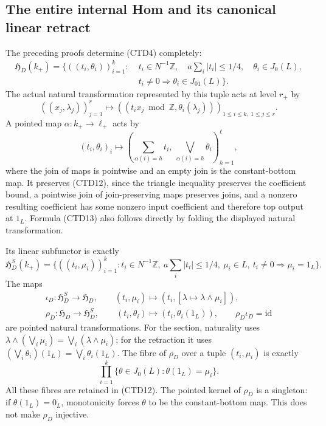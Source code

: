 \subsection{The entire internal Hom and its canonical linear retract}

The preceding proofs determine (CTD4) completely:
\begin{equation}\tag{CTD12}
\begin{split}
\mathfrak H_D(k_+)=\{((t_i,\theta_i))_{i=1}^k:\;&
 t_i\in N^{-1}\mathbb Z,\quad
 a\sum_i|t_i|\le1/4,\quad \theta_i\in J_0(L),\\
 &t_i\ne0\Longrightarrow\theta_i\in J_{01}(L)\}.
\end{split}
\end{equation}
The actual natural transformation represented by this tuple acts
at level $r_+$ by
\[
((x_j,\lambda_j))_{j=1}^r
\longmapsto
((t_i x_j\bmod\mathbb Z,\theta_i(\lambda_j)))_
 {1\le i\le k,\ 1\le j\le r}.
\]
A pointed map $\alpha:k_+\to\ell_+$ acts by
\begin{equation}\tag{CTD13}
(t_i,\theta_i)_i\longmapsto
\left(\sum_{\alpha(i)=h}t_i,\
      \bigvee_{\alpha(i)=h}\theta_i\right)_{h=1}^{\ell},
\end{equation}
where the join of maps is pointwise and an empty join is the
constant-bottom map. It preserves (CTD12), since the triangle
inequality preserves the coefficient bound, a pointwise join of
join-preserving maps preserves joins, and a nonzero resulting
coefficient has some nonzero input coefficient and therefore
top output at $1_L$. Formula (CTD13) also follows directly by
folding the displayed natural transformation.

Its linear subfunctor is exactly
\begin{equation}\tag{CTD14}
\mathfrak H_D^S(k_+)=
\{((t_i,\mu_i))_{i=1}^k:
t_i\in N^{-1}\mathbb Z,\ a\sum_i|t_i|\le1/4,\
\mu_i\in L,\ t_i\ne0\Rightarrow\mu_i=1_L\}.
\end{equation}
The maps
\begin{equation}\tag{CTD15}
\begin{gathered}
\iota_D:\mathfrak H_D^S\longrightarrow\mathfrak H_D,\qquad
(t_i,\mu_i)\longmapsto(t_i,[\lambda\mapsto\lambda\wedge\mu_i]),\\
\rho_D:\mathfrak H_D\longrightarrow\mathfrak H_D^S,\qquad
(t_i,\theta_i)\longmapsto(t_i,\theta_i(1_L)),\qquad
\rho_D\iota_D=\mathrm{id}
\end{gathered}
\end{equation}
are pointed natural transformations. For the section, naturality
uses $\lambda\wedge(\bigvee_i\mu_i)
=\bigvee_i(\lambda\wedge\mu_i)$; for the retraction it uses
$(\bigvee_i\theta_i)(1_L)=\bigvee_i\theta_i(1_L)$.
The fibre of $\rho_D$ over a tuple $(t_i,\mu_i)$ is exactly
\[
\prod_{i=1}^k\{\theta\in J_0(L):\theta(1_L)=\mu_i\}.
\]
All these fibres are retained in (CTD12). The pointed kernel
of $\rho_D$ is a singleton: if $\theta(1_L)=0_L$, monotonicity
forces $\theta$ to be the constant-bottom map. This does not
make $\rho_D$ injective.

